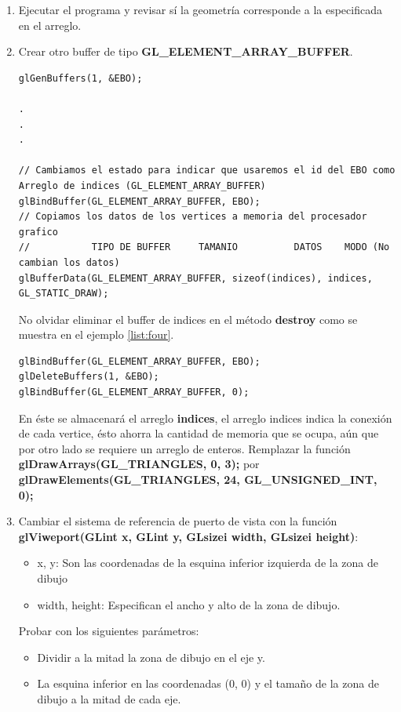 \documentclass[11pt, english]{article}
\begin{document}
\begin{enumerate}
\item Ejecutar el programa y revisar sí la geometría corresponde a la especificada en el arreglo.

\item Crear otro buffer de tipo \textbf{GL\_ELEMENT\_ARRAY\_BUFFER}.
\begin{lstlisting}[label={list:second},caption={Ejemplo para crear un arreglo de indices.}, style=customc]
glGenBuffers(1, &EBO);

.
.
.

// Cambiamos el estado para indicar que usaremos el id del EBO como Arreglo de indices (GL_ELEMENT_ARRAY_BUFFER)
glBindBuffer(GL_ELEMENT_ARRAY_BUFFER, EBO);
// Copiamos los datos de los vertices a memoria del procesador grafico
//           TIPO DE BUFFER     TAMANIO          DATOS    MODO (No cambian los datos)
glBufferData(GL_ELEMENT_ARRAY_BUFFER, sizeof(indices), indices, GL_STATIC_DRAW);
\end{lstlisting}

No olvidar eliminar el buffer de indices en el método \textbf{destroy} como se muestra en el ejemplo \ref{list:four}.
\begin{lstlisting}[label={list:four},caption={Eliminar el buffer de indices.}, style=customc]
glBindBuffer(GL_ELEMENT_ARRAY_BUFFER, EBO);
glDeleteBuffers(1, &EBO);
glBindBuffer(GL_ELEMENT_ARRAY_BUFFER, 0);
\end{lstlisting}

En éste se almacenará el arreglo \textbf{indices}, el arreglo indices indica la conexión de cada vertice, ésto ahorra la cantidad de memoria que se ocupa, aún que por otro lado se requiere un arreglo de enteros. Remplazar la función \textbf{glDrawArrays(GL\_TRIANGLES, 0, 3);} por \textbf{glDrawElements(GL\_TRIANGLES, 24, GL\_UNSIGNED\_INT, 0);}

\item Cambiar el sistema de referencia de puerto de vista con la función \textbf{glViweport(GLint x, GLint y, GLsizei width, GLsizei height)}:
\begin{itemize}
\item x, y: Son las coordenadas de la esquina inferior izquierda de la zona de dibujo
\item width, height: Especifican el ancho y alto de la zona de dibujo.
\end{itemize}

Probar con los siguientes parámetros:

\begin{itemize}
\item Dividir a la mitad la zona de dibujo en el eje y.
\item La esquina inferior en las coordenadas (0, 0) y el tamaño de la zona de dibujo a la mitad de cada eje.
\end{itemize}


\end{enumerate}
\end{document}
